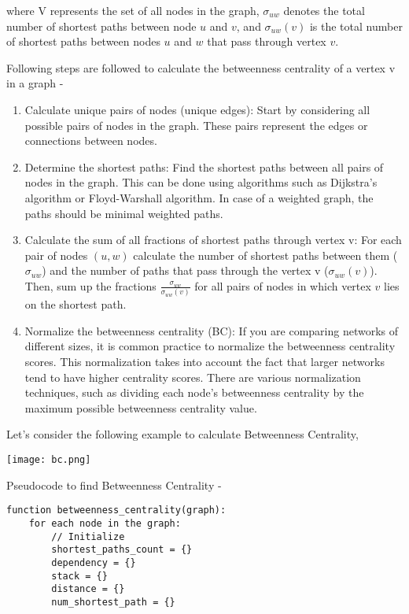 \documentclass{article}
\begin{document}
\begin{itemize}
where V represents the set of all nodes in the graph, $\sigma_{uw}$ denotes the total number of shortest paths between node $u$ and $v$, and $\sigma_{uw}(v)$ is the total number of shortest paths between nodes $u$ and $w$ that pass through vertex $v$.

Following steps are followed to calculate the betweenness centrality of a vertex v in a graph -
\begin{enumerate}
    \item Calculate unique pairs of nodes (unique edges):     
    Start by considering all possible pairs of nodes in the graph. These pairs represent the edges or connections between nodes.
    \item Determine the shortest paths:
    Find the shortest paths between all pairs of nodes in the graph. This can be done using algorithms such as Dijkstra's algorithm or Floyd-Warshall algorithm. In case of a weighted graph, the paths should be minimal weighted paths.
    \item Calculate the sum of all fractions of shortest paths through vertex v:
    For each pair of nodes $(u,w)$ calculate the number of shortest paths between them ($\sigma_{uw}$) and the number of paths that pass through the vertex v ($\sigma_{uw}(v)$). Then, sum up the fractions $\frac{\sigma_{uw}}{\sigma_{uw}(v)}$ for all pairs of nodes in which vertex $v$ lies on the shortest path.
    \item Normalize the betweenness centrality (BC): 
    If you are comparing networks of different sizes, it is common practice to normalize the betweenness centrality scores. This normalization takes into account the fact that larger networks tend to have higher centrality scores. There are various normalization techniques, such as dividing each node's betweenness centrality by the maximum possible betweenness centrality value.
\end{enumerate}

Let's consider the following example to calculate Betweenness Centrality,

\begin{center}
    \texttt{[image: bc.png]}  
\end{center}

Pseudocode to find Betweenness Centrality -

\begin{verbatim}
function betweenness_centrality(graph):
    for each node in the graph:
        // Initialize
        shortest_paths_count = {}
        dependency = {}
        stack = {}
        distance = {}
        num_shortest_path = {}


\end{verbatim}
\end{itemize}
\end{document}
